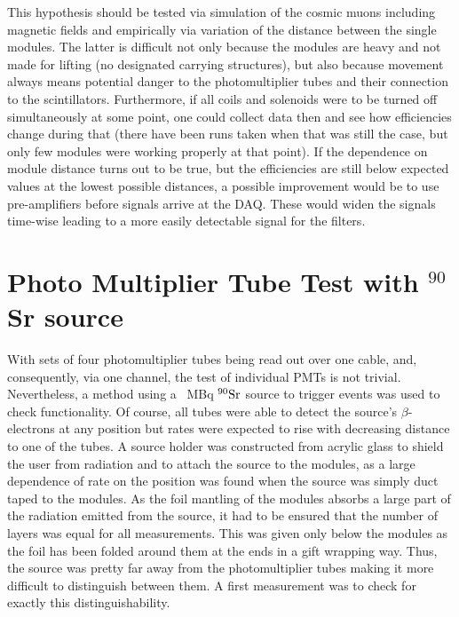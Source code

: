   This hypothesis should be tested via simulation of the cosmic muons including magnetic fields and empirically via variation of the distance between the single modules. The latter is difficult not only because the modules are heavy and not made for lifting (no designated carrying structures), but also because movement always means potential danger to the photomultiplier tubes and their connection to the scintillators.
  Furthermore, if all coils and solenoids were to be turned off simultaneously at some point, one could collect data then and see how efficiencies change during that (there have been runs taken when that was still the case, but only few modules were working properly at that point).
  If the dependence on module distance turns out to be true, but the efficiencies are still below expected values at the lowest possible distances, a possible improvement would be to use pre-amplifiers before signals arrive at the DAQ. These would widen the signals time-wise leading to a more easily detectable signal for the filters.
  
  \section{Photo Multiplier Tube Test with $^{90}$Sr source}
  \label{ch:Analysis:sec:PhotoMultiplierTests}
  
  With sets of four photomultiplier tubes being read out over one cable, and, consequently, via one channel, the test of individual PMTs is not trivial. Nevertheless, a method using a \SI{}{\mega\becquerel} $\rm ^{90}Sr$ source to trigger events was used to check functionality. Of course, all tubes were able to detect the source's $\beta$-electrons at any position but rates were expected to rise with decreasing distance to one of the tubes. A source holder was constructed from acrylic glass to shield the user from radiation and to attach the source to the modules, as a large dependence of rate on the position was found when the source was simply duct taped to the modules. As the foil mantling of the modules absorbs a large part of the radiation emitted from the source, it had to be ensured that the number of layers was equal for all measurements. This was given only below the modules as the foil has been folded around them at the ends in a gift wrapping way. Thus, the source was pretty far away from the photomultiplier tubes making it more difficult to distinguish between them. A first measurement was to check for exactly this distinguishability.


